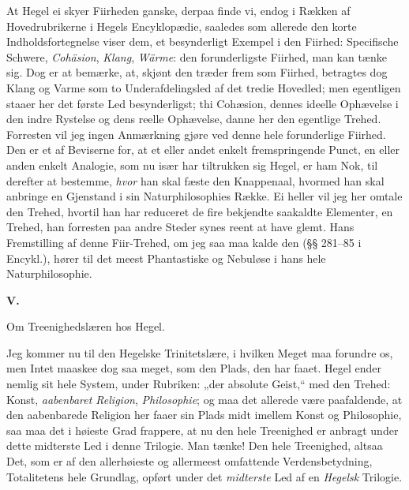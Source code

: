 \documentclass[12pt,a4paper]{book}
\newcommand{\apage}[1]{\marginnote{\footnotesize\textit{[#1]}}}
\begin{document}
At Hegel ei skyer Fiirheden ganske, derpaa finde vi, endog i Rækken af
Hovedrubrikerne i Hegels Encyklopædie, saaledes som allerede den korte
Indholdsfortegnelse viser dem, et besynderligt Exempel i den Fiirhed:
Specifische Schwere, \emph{Cohäsion}, \emph{Klang}, \emph{Wärme}: den forunderligste Fiirhed, man kan
tænke sig. Dog er at bemærke, at, skjønt den træder frem som Fiirhed, betragtes
dog Klang og Varme som to Underafdelingsled af det tredie Hovedled; men
egentligen staaer her det første Led besynderligst; thi Cohæsion, dennes ideelle
Ophævelse i den indre Rystelse og dens reelle Ophævelse, danne her den egentlige
Trehed. Forresten vil jeg ingen Anmærkning gjøre ved denne hele forunderlige
Fiirhed. Den er et af Beviserne for, at et eller andet enkelt fremspringende
Punct, en eller anden enkelt Analogie, som nu især har tiltrukken sig Hegel, er
ham Nok, til derefter at bestemme, \emph{hvor} han skal fæste den Knappenaal, hvormed
han skal anbringe en Gjenstand i sin Naturphilosophies Række. Ei heller vil jeg
her omtale den Trehed, hvortil han har reduceret de fire bekjendte saakaldte
Elementer, en Trehed, han forresten paa andre Steder synes reent at have glemt.
Hans Fremstilling af denne Fiir-Trehed, om jeg saa maa kalde den (§§ 281--85 i
Encykl.), hører til det meest Phantastiske og Nebuløse i hans hele
Naturphilosophie.

%
\bigskip
\begin{center}
{\large\textbf{V.}}

\medskip
Om Treenighedslæren hos Hegel.
\end{center}
\bigskip

Jeg kommer nu til den Hegelske Trinitetslære, i hvilken Meget maa forundre os,
men Intet maaskee dog saa meget, som \apage{138} den Plads, den har faaet. Hegel ender
nemlig sit hele System, under Rubriken: „der absolute Geist,“ med den Trehed:
Konst, \emph{aabenbaret Religion}, \emph{Philosophie}; og maa det allerede være paafaldende,
at den aabenbarede Religion her faaer sin Plads midt imellem Konst og
Philosophie, saa maa det i høieste Grad frappere, at nu den hele Treenighed er
anbragt under dette midterste Led i denne Trilogie. Man tænke! Den hele
Treenighed, altsaa Det, som er af den allerhøieste og allermeest omfattende
Verdensbetydning, Totalitetens hele Grundlag, opført under det \emph{midterste} Led af
en \emph{Hegelsk} Trilogie.
\end{document}
